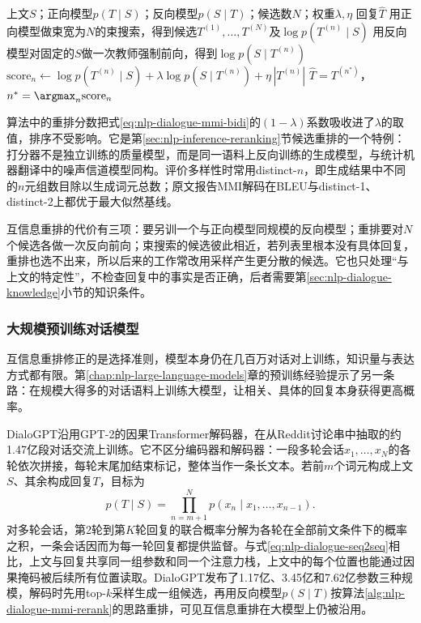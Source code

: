 \begin{algorithm}
  \label{alg:nlp-dialogue-mmi-rerank}
  \begin{algorithmic}[1]
    \Require 上文$S$；正向模型$p(T\mid S)$；反向模型$p(S\mid T)$；候选数$N$；权重$\lambda,\eta$
    \Ensure 回复$\hat T$
    \State 用正向模型做束宽为$N$的束搜索，得到候选$T^{(1)},\ldots,T^{(N)}$及$\log p(T^{(n)}\mid S)$
      \State 用反向模型对固定的$S$做一次教师强制前向，得到$\log p(S\mid T^{(n)})$
      \State $\mathrm{score}_n\gets\log p(T^{(n)}\mid S)+\lambda\log p(S\mid T^{(n)})+\eta\,|T^{(n)}|$
    \EndFor
    \State \Return $\hat T=T^{(n^*)}$，$n^*=\argmax_n\mathrm{score}_n$
  \end{algorithmic}
\end{algorithm}

算法中的重排分数把式\eqref{eq:nlp-dialogue-mmi-bidi}的$(1-\lambda)$系数吸收进了$\lambda$的取值，排序不受影响。它是第\ref{sec:nlp-inference-reranking}节候选重排的一个特例：打分器不是独立训练的质量模型，而是同一语料上反向训练的生成模型，与统计机器翻译中的噪声信道模型同构。评价多样性时常用distinct-$n$，即生成结果中不同的$n$元组数目除以生成词元总数；原文报告MMI解码在BLEU与distinct-1、distinct-2上都优于最大似然基线。

互信息重排的代价有三项：要另训一个与正向模型同规模的反向模型；重排要对$N$个候选各做一次反向前向；束搜索的候选彼此相近，若列表里根本没有具体回复，重排也选不出来，所以后来的工作常改用采样产生更分散的候选。它也只处理“与上文的特定性”，不检查回复中的事实是否正确，后者需要第\ref{sec:nlp-dialogue-knowledge}小节的知识条件。

\subsubsection{大规模预训练对话模型}
\label{sec:nlp-dialogue-pretrained}

互信息重排修正的是选择准则，模型本身仍在几百万对话对上训练，知识量与表达方式都有限。第\ref{chap:nlp-large-language-models}章的预训练经验提示了另一条路：在规模大得多的对话语料上训练大模型，让相关、具体的回复本身获得更高概率。

DialoGPT沿用GPT-2的因果Transformer解码器，在从Reddit讨论串中抽取的约1.47亿段对话交流上训练。它不区分编码器和解码器：一段多轮会话$x_1,\ldots,x_N$的各轮依次拼接，每轮末尾加结束标记，整体当作一条长文本。若前$m$个词元构成上文$S$、其余构成回复$T$，目标为
\begin{equation}
 p(T\mid S)=\prod_{n=m+1}^{N}p(x_n\mid x_1,\ldots,x_{n-1}).
 \label{eq:nlp-dialogue-dialogpt}
\end{equation}
对多轮会话，第2轮到第$K$轮回复的联合概率分解为各轮在全部前文条件下的概率之积，一条会话因而为每一轮回复都提供监督。与式\eqref{eq:nlp-dialogue-seq2seq}相比，上文与回复共享同一组参数和同一个注意力栈，上文中的每个位置也能通过因果掩码被后续所有位置读取。DialoGPT发布了1.17亿、3.45亿和7.62亿参数三种规模，解码时先用top-$k$采样生成一组候选，再用反向模型$p(S\mid T)$按算法\ref{alg:nlp-dialogue-mmi-rerank}的思路重排，可见互信息重排在大模型上仍被沿用。

